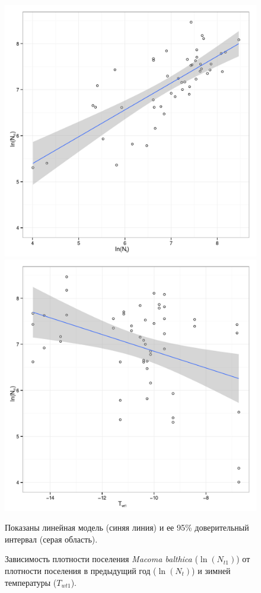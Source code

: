 	\begin{figure}[p]
		\includegraphics[height=0.4\textheight]{../article_Macoma_dynamic_White_sea/N_vs_temperature/lodNt_vs_logNt1_1.pdf}

		\includegraphics[height=0.4\textheight]{../article_Macoma_dynamic_White_sea/N_vs_temperature/Twt1_vs_logNt1_1.pdf}

	\caption{Зависимость плотности поселения  \textit{Macoma balthica} ($\ln(N_{t1})$) от плотности поселения в предыдущий год ($\ln(N_{t})$) и зимней температуры ($T_{wt1}$).}
	\label{ris:model_temperature}
	\footnotesize{Показаны линейная модель (синяя линия) и ее 95\% доверительный интервал (серая область).}
	\end{figure}

